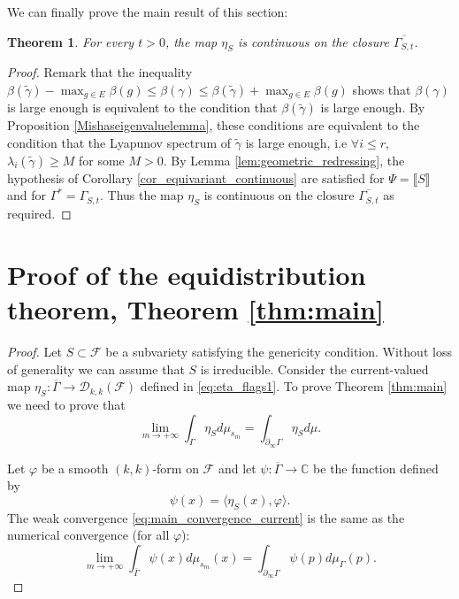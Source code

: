 \documentclass[12pt]{amsbook}%
\newtheorem{thm}{Theorem}[chapter]
\theoremstyle{definition}
\theoremstyle{remark}
\numberwithin{section}{chapter}
\numberwithin{subsection}{section}
\numberwithin{figure}{chapter}
\newcommand\intcur[1]{\llbracket #1 \rrbracket}
\def\refthmmain{\ref{thm:main}}
\def\bC{{\mathbb{C}}}
\def\cF{{\mathscr{F}}}
\def\tga{{\tilde{\gamma}}}
\def\Ga{\Gamma}
\def\geo{\partial_\infty}
\def\ol{\overline}
\begin{document}
{{We can finally prove the main result of this section:  

\begin{thm}\label{continuousonGammaSt}
For every $t> 0$, the map $\eta_S$ is continuous on the closure $\overline{\Gamma_{S,t}}$.
\end{thm}

\begin{proof}
Remark that the inequality $\beta(\tilde{\gamma}) - \max_{g\in E} \beta(g)\leqslant \beta(\gamma) \leqslant \beta(\tilde{\gamma}) + \max_{g\in E} \beta(g)$ shows that $\beta(\gamma)$ is large enough is equivalent to the condition that $\beta(\tga)$ is large enough.
By Proposition \ref{Mishaseigenvaluelemma}, these conditions are equivalent to the condition that the Lyapunov spectrum of $\tga$ is large enough, i.e $\forall i\leqslant r$,  $\lambda_i(\tga) \geqslant M$ for some $M>0$. 
By Lemma \ref{lem:geometric_redressing}, the hypothesis of Corollary \ref{cor_equivariant_continuous} are satisfied for $\Psi = \intcur{S}$ and for $\Gamma^* = \Gamma_{S,t}$.  Thus the map $\eta_S$ is continuous on the closure $\overline{\Gamma_{S,t}}$ as required.
\end{proof}




\section{Proof of the equidistribution theorem, Theorem \refthmmain}\label{sec:mainproof}




\begin{proof}
Let $S\subset \cF$ be a subvariety satisfying the genericity condition. Without loss of generality 
we can assume that $S$ is irreducible. Consider the current-valued map $\eta_S:\ol{\Ga}\rightarrow\mathcal{D}_{k,k}(\cF)$ defined in \eqref{eq:eta_flags1}. To prove Theorem \ref{thm:main} we need to prove that 
\begin{equation}
\label{eq:main_convergence_current}
\lim_{m\rightarrow +\infty}\int_\Gamma \eta_S d\mu_{s_m}=\int_{\geo \Ga}\eta_S d\mu.
\end{equation}

Let $\varphi$ be a smooth $(k,k)$-form on $\cF$ and let $\psi:\overline{\Gamma}\rightarrow \bC$ be the function defined by
\[
\psi(x)=\langle \eta_S(x),\varphi \rangle.
\]
The weak convergence \eqref{eq:main_convergence_current} is the same as the numerical convergence (for all $\varphi$):
\begin{equation}\label{eq:main_convergence1_current}
\lim_{m \rightarrow +\infty} \int_{\overline{\Ga}}\psi(x)d\mu_{s_m}(x) = \int_{\geo \Ga} \psi(p)d\mu_{\Ga}(p).
\end{equation}


\end{proof}}}
\end{document}
